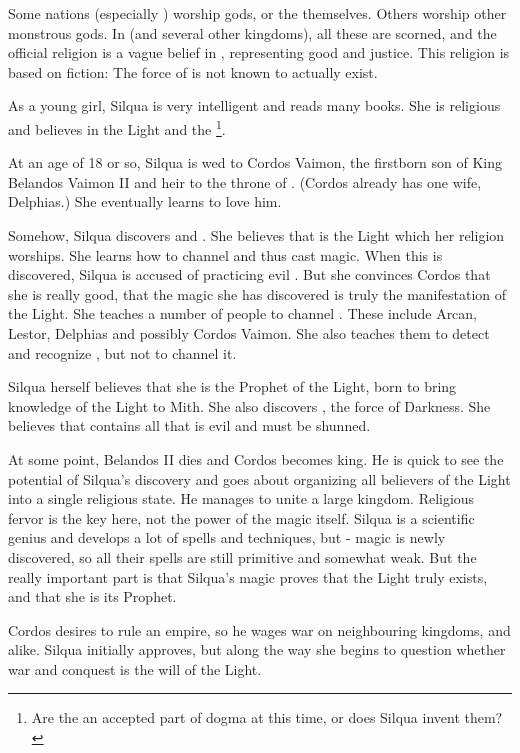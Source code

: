 Some nations (especially \scathaese{}) worship \draconic{} gods, or the \dragons{} themselves. Others worship other monstrous gods. In \Imrath{} (and several other \human{} kingdoms), all these  are scorned, and the official religion is a vague belief in , representing good and justice. This religion is based on fiction: The force of  is not known to actually exist. 

As a young girl, Silqua is very intelligent and reads many books. She is religious and believes in the Light and the \Sephiroth{}\footnote{Are the \Sephiroth{} an accepted part of dogma at this time, or does Silqua invent them?}. 

At an age of 18 or so, Silqua is wed to Cordos Vaimon, the firstborn son of King Belandos Vaimon II and heir to the throne of \Imrath{}. (Cordos already has one wife, Delphias.) She eventually learns to love him. 

Somehow, Silqua discovers \iquin{} and \nieur{}. She believes that \iquin{} is the Light which her religion worships. She learns how to channel \iquin{} and thus cast magic. When this is discovered, Silqua is accused of practicing evil \dragoncraft. But she convinces Cordos that she is really good, that the magic she has discovered is truly the manifestation of the Light. She teaches a number of people to channel \iquin{}. These include Arcan, Lestor, Delphias and possibly Cordos Vaimon. She also teaches them to detect and recognize \nieur{}, but not to channel it. 

Silqua herself believes that she is the Prophet of the Light, born to bring knowledge of the Light to Mith. She also discovers \nieur{}, the force of Darkness. She believes that \nieur{} contains all that is evil and must be shunned. 

At some point, Belandos II dies and Cordos becomes king. He is quick to see the potential of Silqua's discovery and goes about organizing all believers of the Light into a single religious state. He manages to unite a large kingdom. Religious fervor is the key here, not the power of the magic itself. Silqua is a scientific genius and develops a lot of spells and techniques, but \iquin{}-\nieur{} magic is newly discovered, so all their spells are still primitive and somewhat weak. But the really important part is that Silqua's \iquin{} magic proves that the Light truly exists, and that she is its Prophet. 

Cordos desires to rule an empire, so he wages war on neighbouring kingdoms, \scathaese{} and \human{} alike. %
Silqua initially approves, but along the way she begins to question whether war and conquest is the will of the Light. 

